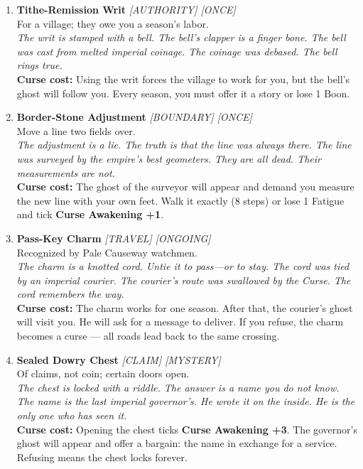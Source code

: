\begin{enumerate}
\item \textbf{Tithe-Remission Writ} \hfill {} \textit{[AUTHORITY] [ONCE]} \\
  For a village; they owe you a season's labor. \\
  \textit{The writ is stamped with a bell. The bell's clapper is a finger bone. The bell was cast from melted imperial coinage. The coinage was debased. The bell rings true.} \\
  \textbf{Curse cost:} Using the writ forces the village to work for you, but the bell's ghost will follow you. Every season, you must offer it a story or lose 1 Boon.

\item \textbf{Border-Stone Adjustment} \hfill {} \textit{[BOUNDARY] [ONCE]} \\
  Move a line two fields over. \\
  \textit{The adjustment is a lie. The truth is that the line was always there. The line was surveyed by the empire's best geometers. They are all dead. Their measurements are not.} \\
  \textbf{Curse cost:} The ghost of the surveyor will appear and demand you measure the new line with your own feet. Walk it exactly (8 steps) or lose 1 Fatigue and tick \textbf{Curse Awakening +1}.

\item \textbf{Pass-Key Charm} \hfill {} \textit{[TRAVEL] [ONGOING]} \\
  Recognized by Pale Causeway watchmen. \\
  \textit{The charm is a knotted cord. Untie it to pass---or to stay. The cord was tied by an imperial courier. The courier's route was swallowed by the Curse. The cord remembers the way.} \\
  \textbf{Curse cost:} The charm works for one season. After that, the courier's ghost will visit you. He will ask for a message to deliver. If you refuse, the charm becomes a curse --- all roads lead back to the same crossing.

\item \textbf{Sealed Dowry Chest} \hfill {} \textit{[CLAIM] [MYSTERY]} \\
  Of claims, not coin; certain doors open. \\
  \textit{The chest is locked with a riddle. The answer is a name you do not know. The name is the last imperial governor's. He wrote it on the inside. He is the only one who has seen it.} \\
  \textbf{Curse cost:} Opening the chest ticks \textbf{Curse Awakening +3}. The governor's ghost will appear and offer a bargain: the name in exchange for a service. Refusing means the chest locks forever.


\end{enumerate}
